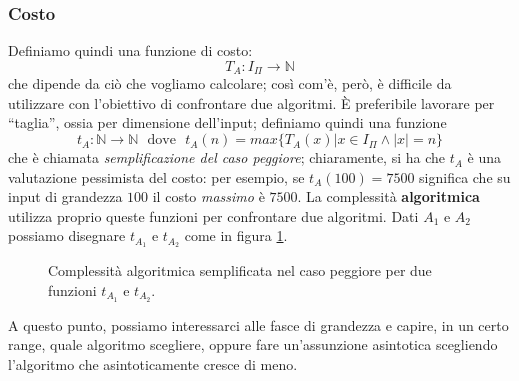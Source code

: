 \subsubsection{Costo}
Definiamo quindi una funzione di costo:
$$
	T_A : I_{\Pi} \rightarrow \mathbb{N}
$$
che dipende da ciò che vogliamo calcolare; così com'è, però, è difficile da
utilizzare con l'obiettivo di confrontare due algoritmi. \`E preferibile
lavorare per ``taglia'', ossia per dimensione dell'input;
definiamo quindi una funzione
$$
	t_A:\mathbb{N} \rightarrow \mathbb{N} ~~~ \text{dove} ~~~ t_A(n) = max\{T_A(x)|x \in I_{\Pi} \land |x| = n\}
$$
che è chiamata \textit{semplificazione del caso peggiore}; chiaramente, si ha
che $t_A$ è una valutazione pessimista del costo: per esempio, se $t_A(100) = 7500$
significa che su input di grandezza $100$ il costo \textit{massimo} è $7500$.
La complessità \textbf{algoritmica} utilizza proprio queste funzioni
per confrontare due algoritmi. Dati $A_1$ e $A_2$ possiamo disegnare $t_{A_1}$
e $t_{A_2}$ come in figura \ref{fig:t1t2algcomp}.


\begin{figure}[ht]
	\centering
	\caption{Complessità algoritmica semplificata nel caso peggiore per due funzioni $t_{A_1}$ e $t_{A_2}$.}
	\label{fig:t1t2algcomp}
\end{figure}

A questo punto, possiamo interessarci alle fasce di grandezza e capire, in un
certo range, quale algoritmo scegliere, oppure fare un'assunzione asintotica
scegliendo l'algoritmo che asintoticamente cresce di meno.

